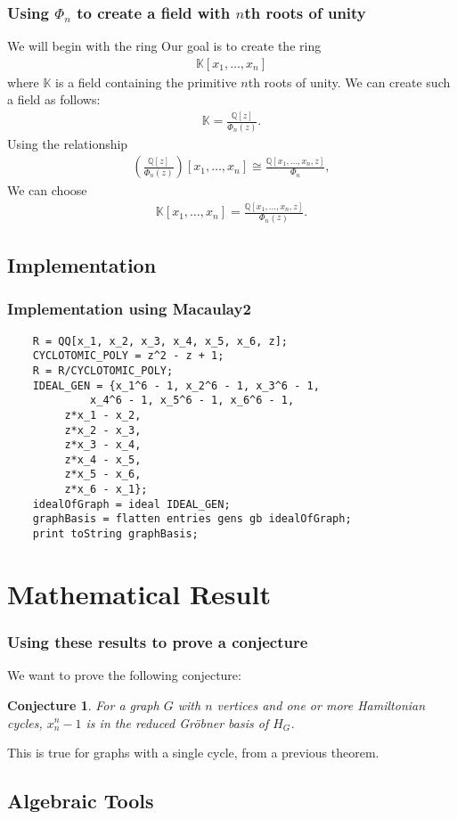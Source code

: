 \documentclass{beamer}
\newtheorem*{conj}{Conjecture}
\newcommand{\aln}[1]{\begin{align*} #1 \end{align*}} %
\begin{document}
\begin{frame}
\frametitle{Using $\Phi_n$ to create a field with $n$th roots of unity}
We will begin with the ring
Our goal is to create the ring
\aln{
  \mathbb{K}[x_1, \ldots, x_n]
}
where $\mathbb{K}$ is a field containing the primitive $n$th roots of unity. We can create such a field as follows:
\aln{
  \mathbb{K} = \frac{\mathbb{Q}[z]}{\Phi_n(z)}.
}
Using the relationship
\aln{
  \left( \frac{\mathbb{Q}[z]}{\Phi_n(z)} \right)[x_1, \ldots, x_n] \cong \frac{\mathbb{Q}[x_1, \ldots, x_n, z]}{\Phi_n},
}
We can choose
\aln{
  \mathbb{K}[x_1, \ldots, x_n] = \frac{\mathbb{Q}[x_1, \ldots, x_n, z]}{\Phi_n(z)}.
}
\end{frame}

\subsection{Implementation}

\begin{frame}[fragile]
\frametitle{Implementation using Macaulay2}
\begin{verbatim}
    R = QQ[x_1, x_2, x_3, x_4, x_5, x_6, z];
    CYCLOTOMIC_POLY = z^2 - z + 1;
    R = R/CYCLOTOMIC_POLY;
    IDEAL_GEN = {x_1^6 - 1, x_2^6 - 1, x_3^6 - 1,
             x_4^6 - 1, x_5^6 - 1, x_6^6 - 1,
	     z*x_1 - x_2,
	     z*x_2 - x_3,
	     z*x_3 - x_4,
	     z*x_4 - x_5,
	     z*x_5 - x_6,
	     z*x_6 - x_1};
    idealOfGraph = ideal IDEAL_GEN;
    graphBasis = flatten entries gens gb idealOfGraph;
    print toString graphBasis;
\end{verbatim}
\end{frame}

\section{Mathematical Result}

\begin{frame}
\frametitle{Using these results to prove a conjecture}
We want to prove the following conjecture:
\begin{conj}
	For a graph $G$ with $n$ vertices and one or more Hamiltonian cycles, $x_n^n - 1$ is in the reduced Gr\"obner basis of $H_G$.
\end{conj}
This is true for graphs with a single cycle, from a previous theorem.
\end{frame}

\subsection{Algebraic Tools}
\end{document}
